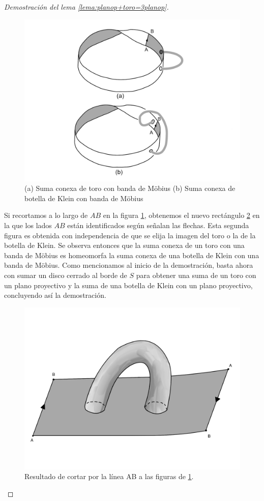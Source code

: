 \documentclass[a4paper,11pt,spanish, twoside, leqno]{tfg-uam}
\theoremstyle{definition}
\begin{document}
\begin{proof}[Demostración del lema \ref{lema:planop+toro=3planop}]
\begin{figure}[h!]
	\centering
	\includegraphics[width=0.5\linewidth]{imagenes/recorte2.png}
	\caption{(a) Suma conexa de toro con banda de M\"obius (b) Suma conexa de botella de Klein con banda de M\"obius}
    \label{recorte2}
\end{figure}

Si recortamos a lo largo de $AB$ en la figura \ref{recorte2}, obtenemos el nuevo rectángulo \ref{recorte3} en la que los lados $AB$ están identificados según señalan las flechas. Esta segunda figura es obtenida con independencia de que se elija la imagen del toro o la de la botella de Klein. Se observa entonces que la suma conexa de un toro con una banda de M\"obius es homeomorfa la suma conexa de una botella de Klein con una banda de M\"obius. Como mencionamos al inicio de la demostración, basta ahora con sumar un disco cerrado al borde de $S$ para obtener una suma de un toro con un plano proyectivo y la suma de una botella de Klein con un plano proyectivo, concluyendo así la demostración.

\begin{figure}[h!]
	\centering
	\includegraphics[width=0.3\linewidth]{imagenes/recorte3.png}
	\caption{Resultado de cortar por la línea AB a las figuras de \ref{recorte2}.}
    \label{recorte3}
\end{figure}
\end{proof}
\end{document}

